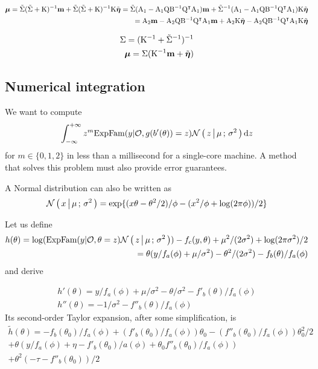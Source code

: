 \begin{align*}
\boldsymbol\mu = \tilde{\Sigma} (\tilde{\Sigma} + \mathrm K)^{-1} \mathbf m + \tilde{\Sigma} (\tilde{\Sigma} +
\mathrm K)^{-1} \mathrm K \tilde{\boldsymbol\eta}
= \tilde{\Sigma} (\mathrm A_1 - \mathrm A_1 \mathrm Q \mathrm B^{-1}\mathrm Q^\intercal \mathrm A_1) \mathbf m +
\tilde{\Sigma}^{-1} (\mathrm A_1 - \mathrm A_1 \mathrm Q \mathrm B^{-1}\mathrm Q^\intercal \mathrm A_1)
          \mathrm K \tilde{\boldsymbol \eta}\\
= \mathrm A_2 \mathbf m - \mathrm A_2 \mathrm Q \mathrm B^{-1}\mathrm Q^\intercal \mathrm A_1 \mathbf m
         + \mathrm A_2 \mathrm K \tilde{\boldsymbol \eta} - \mathrm A_2 \mathrm Q \mathrm B^{-1}\mathrm Q^\intercal
           \mathrm A_1 \mathrm K \tilde{\boldsymbol \eta}
\end{align*}


\begin{align*}
\Sigma = (\mathrm K^{-1} + \tilde{\Sigma}^{-1})^{-1}\\
\boldsymbol\mu = \Sigma (\mathrm K^{-1} \mathbf m + \tilde{\boldsymbol\eta})
\end{align*}

\subsection{Numerical integration}

We want to compute
\begin{align*}
\int_{-\infty}^{+\infty} z^m \text{ExpFam} ({y |\mathcal{O}, g(b'(\theta))=z}) \mathcal{N}\left(\, { {z} \, \big| \, {\mu} } \,;\, { {\sigma^2} } \,\right)\mathrm dz
\end{align*}
for $m\in\{0, 1, 2\}$ in less than a millisecond for a single-core machine. A
method that solves this problem must also provide error guarantees.

A Normal distribution can also be written as
\begin{align*}
\mathcal{N}\left(\, { {x} \, \big| \, {\mu} } \,;\, { {\sigma^2} } \,\right) = \exp\{(x\theta - \theta^2/2)/\phi - (x^2/\phi + \log(2\pi\phi))/2\}
\end{align*}

Let us define
\begin{align*}
h(\theta)= \log(\text{ExpFam} ({y|\mathcal{O}, \theta=z}) \mathcal{N}\left(\, { {z} \, \big| \, {\mu} } \,;\, { {\sigma^2} } \,\right)) - f_c(y, \theta) +
		\mu^2/(2\sigma^2) + \log(2\pi\sigma^2)/2\\
		=\theta(y/f_a(\phi) + \mu/\sigma^2) - \theta^2/(2\sigma^2) - f_b(\theta)/f_a(\phi)
\end{align*}
and derive


\begin{align*}
h'(\theta) = y/f_a(\phi) + \mu/\sigma^2 - \theta/\sigma^2 - f'_b(\theta)/f_a(\phi)\\
h''(\theta) = -1/\sigma^2 - f''_b(\theta)/f_a(\phi)
\end{align*}
Its second-order Taylor expansion, after some simplification, is
\begin{align*}
\tilde h(\theta) = -f_b(\theta_0)/f_a(\phi) + (f'_b(\theta_0)/f_a(\phi))\theta_0 - (f''_b(\theta_0)/f_a(\phi))\theta_0^2/2\\
	+\theta (y/f_a(\phi) + \eta - f'_b(\theta_0)/a(\phi) + \theta_0 f''_b(\theta_0)/f_a(\phi))\\
	+\theta^2(-\tau - f''_b(\theta_0))/2
\end{align*}
